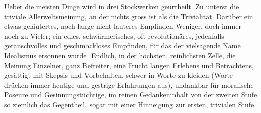 Ueber die meisten Dinge wird in drei Stockwerken geurtheilt. Zu unterst die triviale Allerweltsmeinung, an der nichts gross ist als die Trivialität. Darüber ein etwas geläutertes, noch lange nicht lauteres Empfinden Weniger, doch immer noch zu Vieler; ein edles, schwärmerisches, oft revolutionäres, jedenfalls geräuschvolles und geschmackloses Empfinden, für das der vielsagende Name Idealismus ersonnen wurde. Endlich, in der höchsten, reinlichsten Zelle, die Meinung Einzelner, ganz Befreiter, eine Frucht langen Erlebens und Betrachtens, gesättigt mit Skepsis und Vorbehalten, schwer in Worte zu kleiden (Worte drücken immer heutige und gestrige Erfahrungen aus), undankbar für moralische Poseure und Gesinnungstüchtige, im reinen Gedankeninhalt von der zweiten Stufe so ziemlich das Gegentheil, sogar mit einer  Hinneigung zur ersten, trivialen Stufe.
\par

